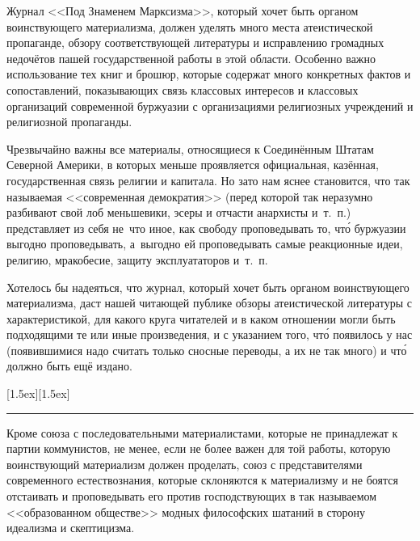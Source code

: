 Журнал <<Под Знаменем Марксизма>>, который хочет быть органом воинствующего
материализма, должен уделять много места атеистической пропаганде, обзору
соответствующей литературы и исправлению громадных недочётов пашей
государственной работы в этой области. Особенно важно использование тех
книг и брошюр, которые содержат много конкретных фактов и сопоставлений,
показывающих связь классовых интересов и классовых организаций современной
буржуазии с организациями религиозных учреждений и религиозной
пропаганды.

Чрезвычайно важны все материалы, относящиеся к Соединённым Штатам Северной
Америки, в которых меньше проявляется официальная, казённая,
государственная связь религии и капитала. Но зато нам яснее становится, что
так называемая <<современная демократия>> (перед которой так неразумно
разбивают свой лоб меньшевики, эсеры и отчасти анархисты и~т.~п.)
представляет из себя не~что иное, как свободу проповедывать то, чт\'{о}
буржуазии выгодно проповедывать, а~выгодно ей проповедывать самые
реакционные идеи, религию, мракобесие, защиту эксплуататоров и~т.~п.

Хотелось бы надеяться, что журнал, который хочет быть органом воинствующего
материализма, даст нашей читающей публике обзоры атеистической литературы с
характеристикой, для какого круга читателей и в каком отношении могли быть
подходящими те или иные произведения, и с указанием того, чт\'{о} появилось у
нас (появившимися надо считать только сносные переводы, а их не так много)
и чт\'{о} должно быть ещё издано.

{\centering \raisebox{0}[1.5ex][1.5ex]{\rule{0.9cm}{0.4pt}} \par}

Кроме союза с последовательными материалистами, которые не принадлежат к
партии коммунистов, не менее, если не более важен для той работы, которую
воинствующий материализм должен проделать, союз с представителями
современного естествознания, которые склоняются к материализму и не боятся
отстаивать и проповедывать его против господствующих в так называемом
<<образованном обществе>> модных философских шатаний в сторону идеализма и
скептицизма.

